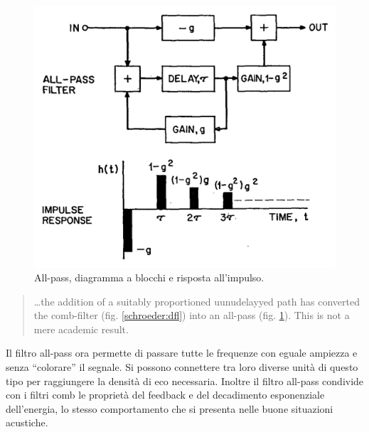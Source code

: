 \begin{refsection}
\begin{figure}[ht]
  \centering
  \includegraphics[width=\textwidth]{CAPITOLI/0500/IMG/allpass.png}
  \caption[]{All-pass, diagramma a blocchi e risposta all'impulso.}
  \label{schroeder:allpass}
\end{figure}

\begin{quote}
  \ldots the addition of a suitably proportioned uunudelayyed path has converted
  the comb-filter (fig. \ref{schroeder:dfl}) into an all-pass (fig.
  \ref{schroeder:allpass}). This is not a mere academic result.
\end{quote}

Il filtro all-pass ora permette di passare tutte le frequenze con eguale ampiezza
e senza “colorare” il segnale. Si possono connettere tra loro diverse unità di
questo tipo per raggiungere la densità di eco necessaria. Inoltre il filtro
all-pass condivide con i filtri comb le proprietà del feedback e del decadimento
esponenziale dell'energia, lo stesso comportamento che si presenta nelle buone
situazioni acustiche.



\printbibliography
\end{refsection}
